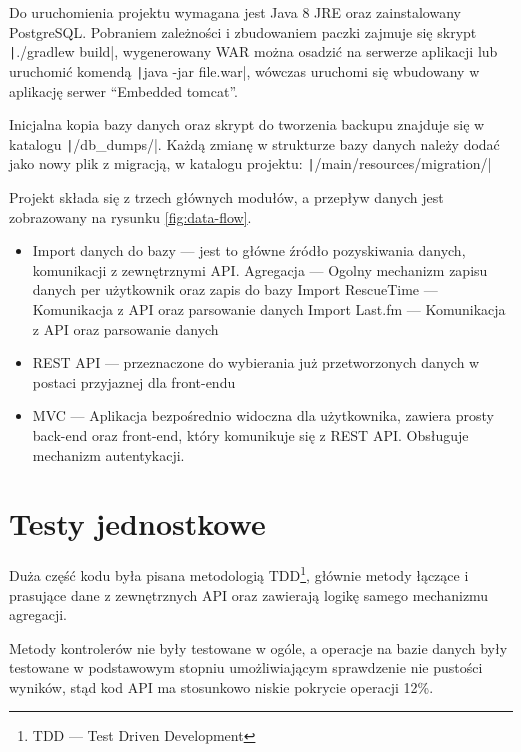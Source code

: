 \documentclass[openright]{xmgr}
\begin{document}
    Do uruchomienia projektu wymagana jest Java 8 JRE oraz zainstalowany PostgreSQL.
    Pobraniem zależności i zbudowaniem paczki zajmuje się skrypt \texttt|./gradlew build|,
    wygenerowany WAR można osadzić na serwerze aplikacji lub uruchomić komendą \texttt|java -jar file.war|,
    wówczas uruchomi się wbudowany w aplikację serwer ``Embedded tomcat''.

    Inicjalna kopia bazy danych oraz skrypt do tworzenia backupu
    znajduje się w katalogu \texttt|/db_dumps/|.
    Każdą zmianę w strukturze bazy danych należy dodać jako nowy plik z migracją, w katalogu projektu:
    \texttt|/main/resources/migration/|

    Projekt składa się z trzech głównych modułów, a przepływ danych jest zobrazowany na rysunku \ref{fig:data-flow}.
    \begin{itemize}
        \item Import danych do bazy --- jest to główne źródło pozyskiwania danych, komunikacji z zewnętrznymi API.
            \subitem Agregacja --- Ogolny mechanizm zapisu danych per użytkownik oraz zapis do bazy
            \subitem Import RescueTime --- Komunikacja z API oraz parsowanie danych
            \subitem Import Last.fm --- Komunikacja z API oraz parsowanie danych
        \item REST API --- przeznaczone do wybierania już przetworzonych danych w postaci przyjaznej dla front-endu
        \item MVC --- Aplikacja bezpośrednio widoczna dla użytkownika,
                zawiera prosty back-end oraz front-end, który komunikuje się z REST API.
                Obsługuje mechanizm autentykacji.
    \end{itemize}

\section{Testy jednostkowe}

Duża część kodu była pisana metodologią TDD\footnote{TDD --- Test Driven Development},
głównie metody łączące i prasujące dane z zewnętrznych API oraz zawierają logikę samego mechanizmu agregacji.

Metody kontrolerów nie były testowane w ogóle,
a operacje na bazie danych były testowane w podstawowym stopniu umożliwiającym sprawdzenie nie pustości wyników,
stąd kod API ma stosunkowo niskie pokrycie operacji 12\%.
\end{document}
